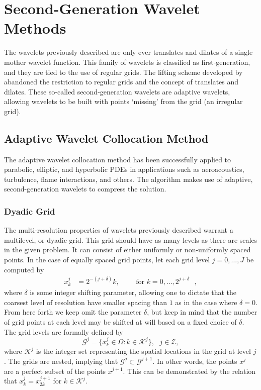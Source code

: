 \documentclass[10.5pt]{article}
\begin{document}
\section*{Second-Generation Wavelet Methods}
The wavelets previously described are only ever translates and dilates of a single mother wavelet function.
This family of wavelets is classified as first-generation, and they are tied to the use of regular grids. 
The lifting scheme developed by \cite{sweldens} abandoned the restriction to regular grids and the concept of translates
and dilates. These so-called second-generation wavelets are adaptive wavelets, allowing wavelets to be built with points
`missing' from the grid (an irregular grid).

\subsection*{Adaptive Wavelet Collocation Method}
The adaptive wavelet collocation method \cite{vasilyev} has been successfully applied to parabolic, elliptic, and
hyperbolic PDEs in applications such as aeroacoustics, turbulence, flame interactions, and others.
The algorithm makes use of adaptive, second-generation wavelets to compress the solution.

\subsubsection*{Dyadic Grid}
The multi-resolution properties of wavelets previously described warrant a multilevel, or dyadic grid.
This grid should have as many levels as there are scales in the given problem. It can consist of 
either uniformly or non-uniformly spaced points. In the case of equally spaced grid points, 
let each grid level $j = 0, \dots, J$ be computed by 
\begin{align}
x^{j}_{k} &= 2^{-(j+\delta)} k,\text{ } \text{ } \text{ }  \text{ for $k=0,\dots,2^{j+\delta}$ },
\end{align}
where $\delta$ is some integer shifting parameter, allowing one to dictate that the coarsest level of resolution have 
smaller spacing than $1$ as in the case where $\delta=0$. From here forth we keep omit the parameter $\delta$, but keep
in mind that the number of grid points at each level may be shifted at will based on a fixed choice of $\delta$. 
The grid levels are formally defined by 
\begin{equation}
    \mathcal{G}^j= \{ x_{k}^{j} \in \Omega : k \in \mathcal{K}^j \}, \text{ } j \in \mathcal{Z},
\end{equation}
where $\mathcal{K}^{j}$ is the integer set representing the spatial locations in the grid at level $j$. The grids are 
nested, implying that $\mathcal{G}^{j} \subset \mathcal{G}^{j+1}$. In other words, the points $x^{j}$ are a perfect 
subset of the points $x^{j+1}$. This can be demonstrated by the relation that 
$x_{k}^{j}=x_{2k}^{j+1}$ for $k \in \mathcal{K}^{j}$.
\end{document}
